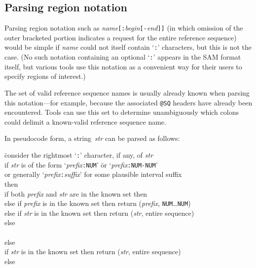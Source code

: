 \documentclass[10pt]{article}
\begin{document}
\begin{appendices}
\appendix
\section{Parsing region notation}\label{sec:parse-region}

Parsing region notation such as \emph{name}{\tt [:}\emph{begin}{\tt [-}\emph{end}{\tt ]]} (in which omission of the outer bracketed portion indicates a request for the entire reference sequence) would be simple if \emph{name} could not itself contain `{\tt :}' characters, but this is not the case.
(No such notation containing an optional `{\tt :}' appears in the SAM format itself, but various tools use this notation as a convenient way for their users to specify regions of interest.)

The set of valid reference sequence names is usually already known when parsing this notation---for example, because the associated {\tt @SQ} headers have already been encountered.
Tools can use this set to determine unambiguously which colons could delimit a known-valid reference sequence name.

In pseudocode form, a string~\emph{str} can be parsed as follows:

\begin{tabbing}
\qquad\quad
\= consider the rightmost `{\tt :}' character, if any, of \emph{str} \+\\
if \emph{str} is of the form `\emph{prefix}{\tt :NUM}' \= or `\emph{prefix}{\tt :NUM-NUM}' \\
\> or generally `\emph{prefix}{\tt :}\emph{suffix}' for some plausible interval suffix \\
then \\
\qquad \= if both \emph{prefix} and \emph{str} are in the known set then \\
\> else if \emph{prefix} is in the known set then return (\emph{prefix}, {\tt NUM}\ldots{\tt NUM}) \\
\> else if \emph{str} is in the known set then return (\emph{str}, entire sequence) \\
\> else \\
\\
else
\\
\> if \emph{str} is in the known set then return (\emph{str}, entire sequence) \\
\> else
\end{tabbing}


\end{appendices}
\end{document}
